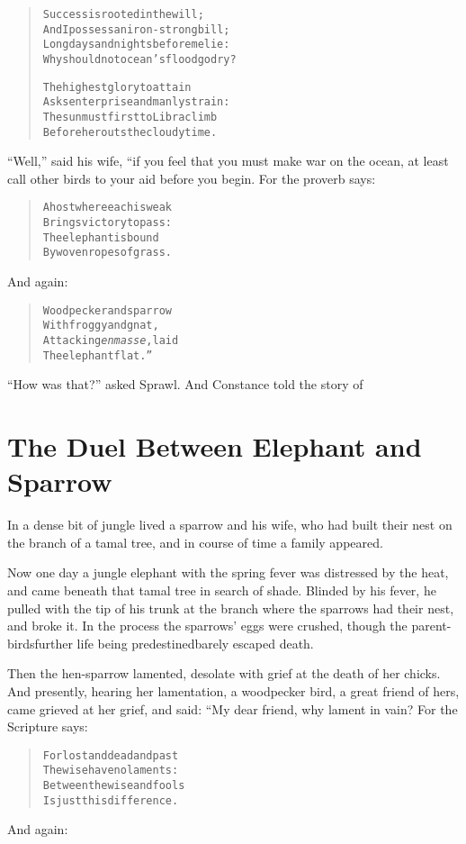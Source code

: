 \documentclass[article, twoside, 14pt]{memoir}
\renewenvironment{verbatim}{%
\begin{quote}%
\vskip -10pt%
\begin{alltt}\normalfont\large}{\end{alltt}%
\end{quote}%
\vskip -10pt
} %
\begin{document}
\begin{verbatim}
Success is rooted in the will;
And I possess an iron-strong bill;
Long days and nights before me lie:
Why should not ocean's flood go dry?

The highest glory to attain
Asks enterprise and manly strain:
The sun must first to Libra climb
Before he routs the cloudy time.
\end{verbatim}
``Well,'' said his wife, “if you feel that you must make war on the
ocean, at least call other birds to your aid before you begin. For
the proverb says:

\begin{verbatim}
A host where each is weak
    Brings victory to pass:
The elephant is bound
    By woven ropes of grass.
\end{verbatim}
And again:

\begin{verbatim}
Woodpecker and sparrow
    With froggy and gnat,
Attacking \emph{en masse}, laid
    The elephant flat.”
\end{verbatim}
``How was that?'' asked Sprawl. And Constance told the story of

\chapter{The Duel Between Elephant and Sparrow}

\label{s21}

In a dense bit of jungle lived a sparrow and his wife, who had
built their nest on the branch of a tamal tree, and in course of
time a family appeared.

Now one day a jungle elephant with the spring fever was distressed
by the heat, and came beneath that tamal tree in search of shade.
Blinded by his fever, he pulled with the tip of his trunk at the
branch where the sparrows had their nest, and broke it. In
the process the sparrows' eggs were crushed, though the
parent-birds{\textemdash}further life being predestined{\textemdash}barely escaped
death.

Then the hen-sparrow lamented, desolate with grief at the death of
her chicks. And presently, hearing her lamentation, a woodpecker
bird, a great friend of hers, came grieved at her grief, and said:
“My dear friend, why lament in vain? For the Scripture says:

\begin{verbatim}
For lost and dead and past
    The wise have no laments:
Between the wise and fools
    Is just this difference.
\end{verbatim}
And again:
\end{document}
